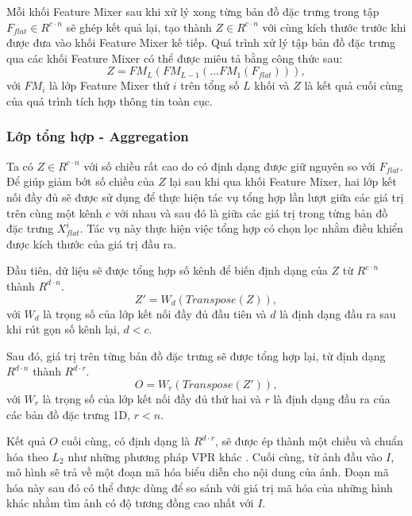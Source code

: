 Mỗi khối Feature Mixer sau khi xử lý xong từng bản đồ đặc trưng trong tập $F_{flat} \in R^{c \cdot n}$ sẽ ghép kết quả lại, tạo thành $Z \in R^{c \cdot n}$ với cùng kích thước trước khi được đưa vào khối Feature Mixer kế tiếp. Quá trình xử lý tập bản đồ đặc trưng qua các khối Feature Mixer có thể được miêu tả bằng công thức sau:
\begin{equation}
  Z = FM_L(FM_{L-1}(\dots FM_1(F_{flat}))),
\end{equation}
với $FM_i$ là lớp Feature Mixer thứ $i$ trên tổng số $L$ khối và $Z$ là kết quả cuối cùng của quá trình tích hợp thông tin toàn cục.

\subsubsection{Lớp tổng hợp - Aggregation}
Ta có $Z \in R^{c \cdot n}$ với số chiều rất cao do có định dạng được giữ nguyên so với $F_{flat}$. Để giúp giảm bớt số chiều của $Z$ lại sau khi qua khối Feature Mixer, hai lớp kết nối đầy đủ sẽ được sử dụng để thực hiện tác vụ tổng hợp lần lượt giữa các giá trị trên cùng một kênh $c$ với nhau và sau đó là giữa các giá trị trong từng bản đồ đặc trưng $X_{flat}^i$. Tác vụ này thực hiện việc tổng hợp có chọn lọc nhằm điều khiển được kích thước của giá trị đầu ra.

Đầu tiên, dữ liệu sẽ được tổng hợp số kênh để biến định dạng của $Z$ từ $R^{c \cdot n}$ thành $R^{d \cdot n}$.
\begin{equation}
  Z' = W_d(Transpose(Z)),
\end{equation}
với $W_d$ là trọng số của lớp kết nối đầy đủ đầu tiên và $d$ là định dạng đầu ra sau khi rút gọn số kênh lại, $d<c$.

Sau đó, giá trị trên từng bản đồ đặc trưng sẽ được tổng hợp lại, từ định dạng $R^{d \cdot n}$ thành $R^{d \cdot r}$.
\begin{equation}
  O = W_r(Transpose(Z')),
\end{equation}
với $W_r$ là trọng số của lớp kết nối đầy đủ thứ hai và $r$ là định dạng đầu ra của các bản đồ đặc trưng 1D, $r<n$.

Kết quả $O$ cuối cùng, có định dạng là $R^{d \cdot r}$, sẽ được ép thành một chiều và chuẩn hóa theo $L_2$ như những phương pháp VPR khác \cite{arandjelovic2016netvlad,berton2022rethinking}. Cuối cùng, từ ảnh đầu vào $I$, mô hình sẽ trả về một đoạn mã hóa biểu diễn cho nội dung của ảnh. Đoạn mã hóa này sau đó có thể được dùng để so sánh với giá trị mã hóa của những hình khác nhằm tìm ảnh có độ tương đồng cao nhất với $I$.


